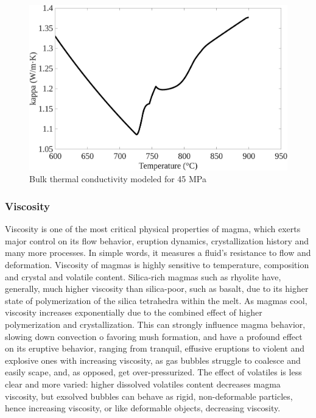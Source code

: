 \begin{figure}[H]
    \centering
    \includegraphics[width=1\linewidth]{img/chapter2/properties/kappa/SMOOTHED_kappa.png}
    \caption{Bulk thermal conductivity modeled for 45 MPa}
    \label{fig:enter-label}
\end{figure}

\subsubsection{Viscosity}
Viscosity is one of the most critical physical properties of magma, which exerts major control on its flow behavior, eruption dynamics, crystallization history and many more processes. In simple words, it measures a fluid's resistance to flow and deformation. Viscosity of magmas is highly sensitive to temperature, composition and crystal and volatile content. Silica-rich magmas such as rhyolite have, generally, much higher viscosity than silica-poor, such as basalt, due to its higher state of polymerization of the silica tetrahedra within the melt. As magmas cool, viscosity increases exponentially due to the combined effect of higher polymerization and crystallization. This can strongly influence magma behavior, slowing down convection o favoring mush formation, and have a profound effect on its eruptive behavior, ranging from tranquil, effusive eruptions to violent and explosive ones with increasing viscosity, as gas bubbles struggle to coalesce and easily scape, and, as opposed, get over-pressurized. The effect of volatiles is less clear and more varied: higher dissolved volatiles content decreases magma viscosity, but exsolved bubbles can behave as rigid, non-deformable particles, hence increasing viscosity, or like deformable objects, decreasing viscosity.

